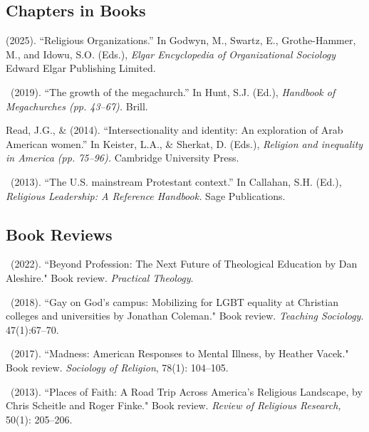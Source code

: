 \subsection*{Chapters in Books}
\begin{etaremune} 
\item \Eagle \hspace{.01em}  (2025). ``Religious Organizations.'' In Godwyn, M., Swartz, E., Grothe-Hammer, M., and Idowu, S.O. (Eds.), \emph{Elgar Encyclopedia of Organizational Sociology} Edward Elgar Publishing Limited.

\item \Eagle\ (2019). ``The growth of the megachurch.'' In Hunt, S.J. (Ed.), \emph{Handbook of Megachurches (pp. 43--67).} Brill.

\item Read, J.G., \& \Eagle \hspace{.01em}  (2014). ``Intersectionality and identity: An exploration of Arab American women.'' In Keister, L.A., \& Sherkat, D. (Eds.), \emph{Religion and inequality in America (pp. 75--96).} Cambridge University Press.

\item \Eagle\ (2013). ``The U.S. mainstream Protestant context.'' In Callahan, S.H. (Ed.), \emph{Religious Leadership: A Reference Handbook.} Sage Publications.
\end{etaremune}

\subsection*{Book Reviews}
\begin{etaremune} 
\item \Eagle\  (2022). ``Beyond Profession: The Next Future of Theological Education by Dan Aleshire." Book review.  \emph{Practical Theology}. 
	
\item \Eagle\  (2018). ``Gay on God’s campus: Mobilizing for LGBT equality at Christian colleges and universities by Jonathan Coleman." Book review. \emph{Teaching Sociology}. 47(1):67--70. 

\item \Eagle\ (2017). ``Madness: American Responses to Mental Illness, by Heather Vacek." Book review. \emph{Sociology of Religion}, 78(1): 104--105. 

\item \Eagle\ (2013). ``Places of Faith: A Road Trip Across America's Religious Landscape, by Chris Scheitle and Roger Finke." Book review.  \emph{Review of Religious Research,} 50(1): 205--206. 
\end{etaremune}

